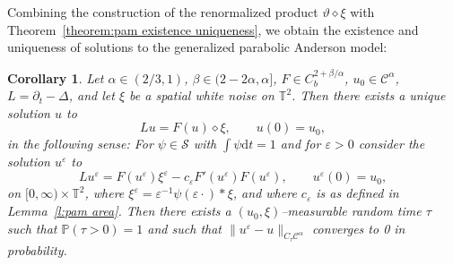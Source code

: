 \documentclass[a4paper,11pt]{article}
\newcommand{\mathd}{\mathrm{d}}
\newtheorem{corollary}[theorem]{Corollary}
\theoremstyle{remark}
\renewcommand{\P}{\mathbb{P}}
\newcommand{\CC}{\ensuremath{\mathscr{C}}}
\newcommand{\CS}{\ensuremath{\mathscr{S}}}
\begin{document}
Combining the construction of the renormalized product $\vartheta \diamond \xi$ with Theorem~\ref{theorem:pam existence uniqueness}, we obtain the existence and uniqueness of solutions to the generalized parabolic Anderson model:

\begin{corollary}
  Let $\alpha \in ( 2/3, 1)$, $\beta\in (2-2\alpha,\alpha]$, $F \in C^{2+\beta/\alpha}_b$, $u_0 \in \CC^\alpha$, $L = \partial_t-\Delta$, and let $\xi$ be a spatial white noise on $\mathbb{T}^2$. Then there exists a unique solution $u$ to
  \[
     L u = F(u)\diamond \xi, \qquad u(0) = u_0,
  \]
  in the following sense: For $\psi \in \CS$ with $\int \psi \mathd t=1$ and for $\varepsilon > 0$ consider the solution $u^\varepsilon$ to
  \[
     L u^{\varepsilon} =F ( u^{\varepsilon} ) \xi^{\varepsilon} -c_{\varepsilon} F' ( u^{\varepsilon} ) F ( u^{\varepsilon} ) , \hspace{2em} u^{\varepsilon} ( 0 ) =u_{0},
  \]
  on $[0, \infty)\times\mathbb{T}^2$, where $\xi^\varepsilon = \varepsilon^{-1} \psi(\varepsilon \cdot) \ast \xi$, and where $c_\varepsilon$ is as defined in Lemma~\ref{l:pam area}. Then there exists a $(u_0, \xi)$--measurable random time $\tau$ such that $\P(\tau>0) = 1$ and such that $\| u^\varepsilon - u \|_{C_\tau \CC^\alpha}$ converges to 0 in probability.
\end{corollary}
\end{document}
